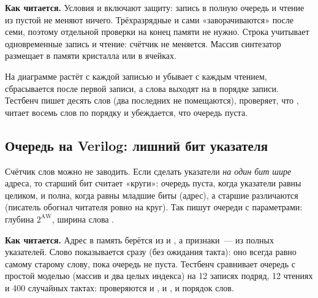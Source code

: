 
\textbf{Как читается.} Условия  и  включают защиту:
запись в полную очередь и чтение из пустой не меняют ничего. Трёхразрядные
 и  сами «заворачиваются» после семи, поэтому отдельной
проверки на конец памяти не нужно. Строка
 учитывает одновременные запись и
чтение: счётчик не меняется. Массив  синтезатор размещает в
памяти кристалла или в ячейках.


На диаграмме  растёт с каждой записью и убывает с каждым чтением,
 сбрасывается после первой записи, а слова выходят на  в
порядке записи. Тестбенч  пишет десять слов (два
последних не помещаются), проверяет, что , читает восемь слов по
порядку и убеждается, что очередь пуста.

\subsection{Очередь на Verilog: лишний бит указателя}

Счётчик слов можно не заводить. Если сделать указатели \emph{на один бит
шире} адреса, то старший бит считает «круги»: очередь пуста, когда указатели
равны целиком, и полна, когда равны младшие биты (адрес), а старшие различаются
(писатель обогнал читателя ровно на круг). Так пишут очереди с параметрами:
глубина $2^{\text{AW}}$, ширина слова .


\textbf{Как читается.} Адрес в память берётся из  и
, а признаки~--- из полных указателей. Слово 
показывается сразу (без ожидания такта): оно всегда равно самому старому
слову, пока очередь не пуста. Тестбенч  сравнивает очередь
с простой моделью (массив и два целых индекса) на 12 записях подряд, 12
чтениях и 400 случайных тактах: проверяются и , и , и
порядок слов.

